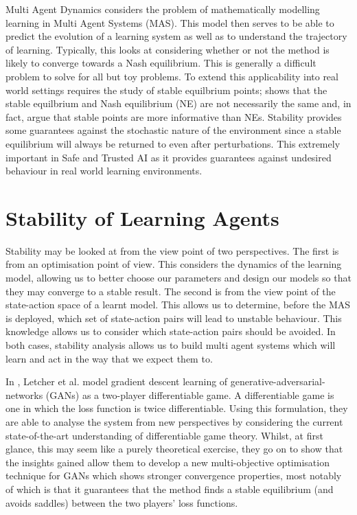 \documentclass[preprint,8pt]{report}
\begin{document}
Multi Agent Dynamics considers the problem of mathematically modelling learning in Multi Agent Systems (MAS). This model then serves to be able to predict the evolution of a learning system as well as to understand the trajectory of learning. Typically, this looks at considering whether or not the method is likely to converge towards a Nash equilibrium. This is generally a difficult problem to solve \cite{ShohamMultiagentFoundations} for all but toy problems. To extend this applicability into real world settings requires the study of stable equilbrium points; \cite{Letcher2019DifferentiableMechanics} shows that the stable equilbrium and Nash equilibrium (NE) are not necessarily the same and, in fact, argue that stable points are more informative than NEs. Stability provides some guarantees against the stochastic nature of the environment since a stable equilibrium will always be returned to even after perturbations. This extremely important in Safe and Trusted AI as it provides guarantees against undesired behaviour in real world learning environments. 

\section{Stability of Learning Agents}

Stability may be looked at from the view point of two perspectives. The first is from an optimisation point of view. This considers the dynamics of the learning model, allowing us to better choose our parameters and design our models so that they may converge to a stable result. The second is from the view point of the state-action space of a learnt model. This allows us to determine, before the MAS is deployed, which set of state-action pairs will lead to unstable behaviour. This knowledge allows us to consider which state-action pairs should be avoided. In both cases, stability analysis allows us to build multi agent systems which will learn and act in the way that we expect them to.

In \cite{Letcher2019DifferentiableMechanics}, Letcher et al. model gradient descent learning of generative-adversarial-networks (GANs) as a two-player differentiable game. A differentiable game is one in which the loss function is twice differentiable. Using this formulation, they are able to analyse the system from new perspectives by considering the current state-of-the-art understanding of differentiable game theory. Whilst, at first glance, this may seem like a purely theoretical exercise, they go on to show that the insights gained allow them to develop a new multi-objective optimisation technique for GANs which shows stronger convergence properties, most notably of which is that it guarantees that the method finds a stable equilibrium (and avoids saddles) between the two players' loss functions.
\end{document}
